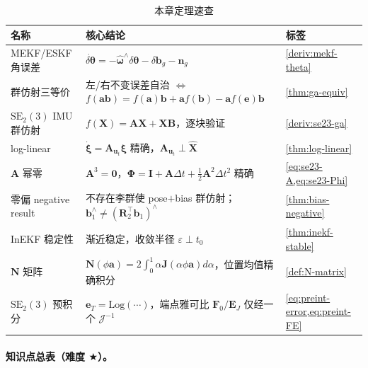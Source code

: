 \begin{table}[H]\centering\small
\caption{本章定理速查}
\begin{tabular}{lll}
\toprule
名称 & 核心结论 & 标签 \\
\midrule
MEKF/ESKF 角误差 & $\dot{\delta\boldsymbol{\theta}}=-\hat{\boldsymbol{\omega}}^\wedge\delta\boldsymbol{\theta}-\delta\mathbf{b}_g-\mathbf{n}_g$ & \cref{deriv:mekf-theta} \\
群仿射三等价 & 左/右不变误差自治 $\Leftrightarrow$ $f(\mathbf{a}\mathbf{b})=f(\mathbf{a})\mathbf{b}+\mathbf{a}f(\mathbf{b})-\mathbf{a}f(\mathbf{e})\mathbf{b}$ & \cref{thm:ga-equiv} \\
$\mathrm{SE}_2(3)$ IMU 群仿射 & $f(\mathbf{X})=\mathbf{A}\mathbf{X}+\mathbf{X}\mathbf{B}$，逐块验证 & \cref{deriv:se23-ga} \\
log-linear & $\dot{\boldsymbol{\xi}}=\mathbf{A}_{\mathbf{u}_t}\boldsymbol{\xi}$ 精确，$\mathbf{A}_{\mathbf{u}_t}\perp\hat{\mathbf{X}}$ & \cref{thm:log-linear} \\
$\mathbf{A}$ 幂零 & $\mathbf{A}^3=\mathbf{0}$，$\boldsymbol{\Phi}=\mathbf{I}+\mathbf{A}\Delta t+\tfrac12\mathbf{A}^2\Delta t^2$ 精确 & \cref{eq:se23-A,eq:se23-Phi} \\
零偏 negative result & 不存在李群使 pose$+$bias 群仿射；$\mathbf{b}_1^\wedge\neq(\mathbf{R}_2^\top\mathbf{b}_1)^\wedge$ & \cref{thm:bias-negative} \\
InEKF 稳定性 & 渐近稳定，收敛半径 $\varepsilon\perp t_0$ & \cref{thm:inekf-stable} \\
$\mathbf{N}$ 矩阵 & $\mathbf{N}(\phi\mathbf{a})=2\!\int_0^1\!\alpha\mathbf{J}(\alpha\phi\mathbf{a})d\alpha$，位置均值精确积分 & \cref{def:N-matrix} \\
$\mathrm{SE}_2(3)$ 预积分 & $\mathbf{e}_T=\mathrm{Log}(\cdots)$，端点雅可比 $\mathbf{F}_0/\mathbf{E}_J$ 仅经一个 $\boldsymbol{\mathcal{J}}^{-1}$ & \cref{eq:preint-error,eq:preint-FE} \\
\bottomrule
\end{tabular}
\end{table}

\paragraph{知识点总表（难度 $\bigstar$）。}

